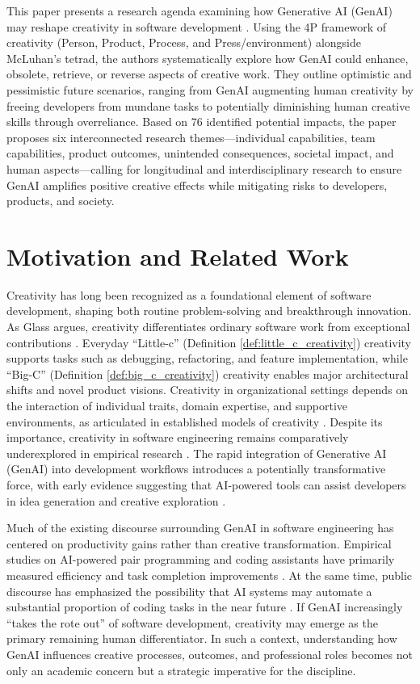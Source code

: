 This paper presents a research agenda examining how Generative AI (GenAI) may reshape creativity in software development . Using the 4P framework of creativity (Person, Product, Process, and Press/environment) alongside McLuhan's tetrad, the authors systematically explore how GenAI could enhance, obsolete, retrieve, or reverse aspects of creative work. They outline optimistic and pessimistic future scenarios, ranging from GenAI augmenting human creativity by freeing developers from mundane tasks to potentially diminishing human creative skills through overreliance. Based on 76 identified potential impacts, the paper proposes six interconnected research themes—individual capabilities, team capabilities, product outcomes, unintended consequences, societal impact, and human aspects—calling for longitudinal and interdisciplinary research to ensure GenAI amplifies positive creative effects while mitigating risks to developers, products, and society.

\section{Motivation and Related Work}
Creativity has long been recognized as a foundational element of software development, shaping both routine problem-solving and breakthrough innovation. As Glass argues, creativity differentiates ordinary software work from exceptional contributions \cite{glass1994software}. Everyday “Little-c” (Definition \ref{def:little_c_creativity}) creativity supports tasks such as debugging, refactoring, and feature implementation, while “Big-C” (Definition \ref{def:big_c_creativity}) creativity enables major architectural shifts and novel product visions. Creativity in organizational settings depends on the interaction of individual traits, domain expertise, and supportive environments, as articulated in established models of creativity \cite{amabile1988model}. Despite its importance, creativity in software engineering remains comparatively underexplored in empirical research \cite{amin2018snapshot}. The rapid integration of Generative AI (GenAI) into development workflows introduces a potentially transformative force, with early evidence suggesting that AI-powered tools can assist developers in idea generation and creative exploration \cite{bockeler2023genai}.

Much of the existing discourse surrounding GenAI in software engineering has centered on productivity gains rather than creative transformation. Empirical studies on AI-powered pair programming and coding assistants have primarily measured efficiency and task completion improvements \cite{bird2023copilot, ziegler2024copilot}. At the same time, public discourse has emphasized the possibility that AI systems may automate a substantial proportion of coding tasks in the near future \cite{scheffler2023copilot80}. If GenAI increasingly “takes the rote out” of software development, creativity may emerge as the primary remaining human differentiator. In such a context, understanding how GenAI influences creative processes, outcomes, and professional roles becomes not only an academic concern but a strategic imperative for the discipline.


